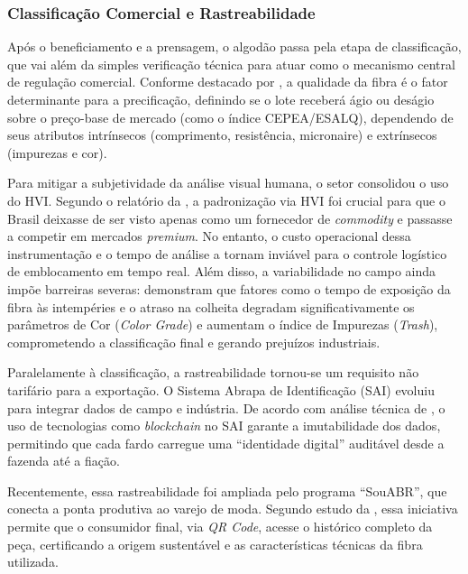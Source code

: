     \subsubsection{Classificação Comercial e Rastreabilidade}

        Após o beneficiamento e a prensagem, o algodão passa pela etapa de classificação, que vai além da simples verificação técnica para atuar como o mecanismo central de regulação comercial. Conforme destacado por , a qualidade da fibra é o fator determinante para a precificação, definindo se o lote receberá ágio ou deságio sobre o preço-base de mercado (como o índice CEPEA/ESALQ), dependendo de seus atributos intrínsecos (comprimento, resistência, micronaire) e extrínsecos (impurezas e cor).

        Para mitigar a subjetividade da análise visual humana, o setor consolidou o uso do HVI. Segundo o relatório da , a padronização via HVI foi crucial para que o Brasil deixasse de ser visto apenas como um fornecedor de \textit{commodity} e passasse a competir em mercados \textit{premium}. No entanto, o custo operacional dessa instrumentação e o tempo de análise a tornam inviável para o controle logístico de emblocamento em tempo real. Além disso, a variabilidade no campo ainda impõe barreiras severas:  demonstram que fatores como o tempo de exposição da fibra às intempéries e o atraso na colheita degradam significativamente os parâmetros de Cor (\textit{Color Grade}) e aumentam o índice de Impurezas (\textit{Trash}), comprometendo a classificação final e gerando prejuízos industriais.

        Paralelamente à classificação, a rastreabilidade tornou-se um requisito não tarifário para a exportação. O Sistema Abrapa de Identificação (SAI) evoluiu para integrar dados de campo e indústria. De acordo com análise técnica de , o uso de tecnologias como \textit{blockchain} no SAI garante a imutabilidade dos dados, permitindo que cada fardo carregue uma ``identidade digital'' auditável desde a fazenda até a fiação.

        Recentemente, essa rastreabilidade foi ampliada pelo programa ``SouABR'', que conecta a ponta produtiva ao varejo de moda. Segundo estudo da , essa iniciativa permite que o consumidor final, via \textit{QR Code}, acesse o histórico completo da peça, certificando a origem sustentável e as características técnicas da fibra utilizada.

